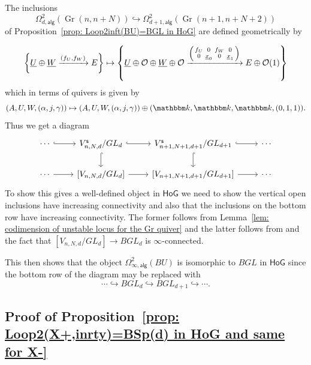 \documentclass{amsart}
\theoremstyle{definition}
\newcommand{\kk} {{\mathbbm k}}
\newcommand{\HoG}{\textsf{HoG}}
\newcommand{\OO}{\mathcal{O}}
\newcommand{\UL}[1]{\underline{#1}}
\newcommand{\alg}{\mathsf{alg}}
\newcommand{\stable}{\mathsf{s}}
\newcommand{\Gr}{\operatorname{Gr}}
\newcommand{\LoopTwo}{\Omega^{2}_{d,\alg}}
\begin{document}
The inclusions 
\[
\LoopTwo (\Gr (n,n+N))\hookrightarrow
\Omega^{2}_{d+1,\alg}(\Gr (n+1,n+N+2))
\]
of Proposition~\ref{prop:
Loop2inft(BU)=BGL in HoG} are defined geometrically by

\[
\left\{\UL{U}\oplus \UL{W}\xrightarrow{(f_{U},f_{W})}E \right\}\mapsto
\left\{\UL{U}\oplus \OO \oplus \UL{W}\oplus \OO
\xrightarrow{\begin{psmallmatrix}f_{U}&0&f_{W}&0\\ 0&\UL{x}_{0}&0& \UL{x}_{1}   \end{psmallmatrix}
}E\oplus \OO (1) \right\}
\]
which in terms of quivers is given by
\[
(A,U,W,(\alpha ,j,\gamma))\mapsto (A,U,W,(\alpha ,j, \gamma ))\oplus
(\kk ,\kk ,\kk ,(0,1,1)). 
\]
Thus we get a diagram
\[
\begin{tikzcd}
    \cdots \arrow[r, hook]
    & V^{\stable}_{n,N,d}/GL_{d} \arrow[r, hook] \arrow[d, hook]
    & V^{\stable}_{n+1,N+1,d+1}/GL_{d+1}  \arrow[r, hook] \arrow[d, hook] & \cdots \\
    \cdots \arrow[r]
    & \left[V_{n,N,d}/GL_{d} \right] \arrow[r]
    & \left[V_{n+1,N+1,d+1}/GL_{d+1} \right] 
\arrow[r] & \cdots
\end{tikzcd}
\]
To show this gives a well-defined object in $\HoG$ we need to show the
vertical open inclusions have increasing connectivity and also that
the inclusions on the bottom row have increasing connectivity. The
former follows from Lemma~\ref{lem: codimension of unstable locus for
the Gr quiver} and the latter follows from
\cite[Prop~2.2]{Larson-Vakil-BottPeriodicity} and the fact that
$\left[V_{n,N,d}/GL_{d} \right] \to BGL_{d}$ is
$\infty$-connected.


This then shows that the object $\Omega^{2}_{\infty ,\alg}(BU)$ is
isomorphic to $BGL$ in $\HoG$ since the bottom row of the diagram may
be replaced with 
\[
\dotsb \hookrightarrow BGL_{d}\hookrightarrow BGL_{d+1}\hookrightarrow \dotsb .
\]

\subsection{Proof of Proposition~\ref{prop: Loop2(X+,inrty)=BSp(d) in HoG and same
for X-}}
\end{document}
